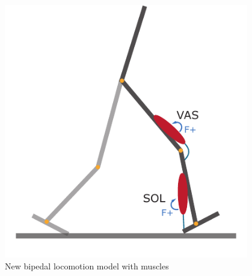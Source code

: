 \documentclass[10pt]{beamer}
\begin{document}
\begin{frame}
\begin{figure}
\begin{overprint}
		\begin{columns}
			\begin{column}{.55\textwidth}
				\centering
				\includegraphics[height=.5\textheight]{images/new_model/stance/muscle_vas_sol.pdf}
				\caption{New bipedal locomotion model with muscles}
			\end{column}
			\begin{column}{.5\textwidth}
				\centering
				 \\
			\end{column}  
		\end{columns}
	

\end{overprint}
\end{figure}
\end{frame}
\end{document}
